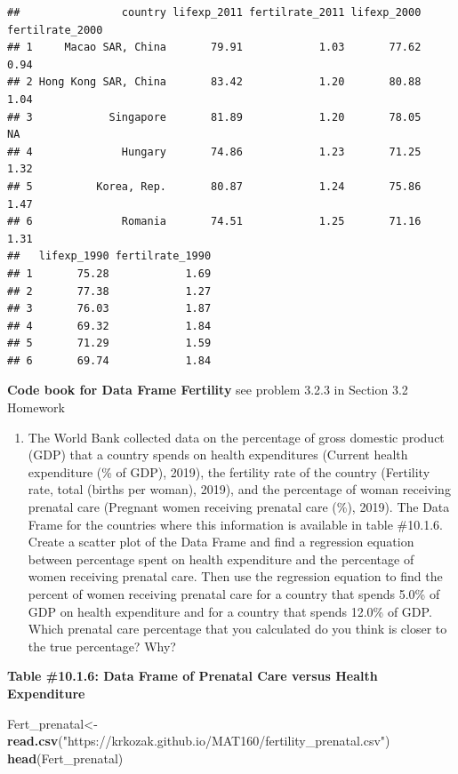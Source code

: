 \documentclass[
]{book}
\newenvironment{Shaded}{\begin{snugshade}}{\end{snugshade}}
\newcommand{\KeywordTok}[1]{\textcolor[rgb]{0.13,0.29,0.53}{\textbf{#1}}}
\newcommand{\NormalTok}[1]{#1}
\newcommand{\StringTok}[1]{\textcolor[rgb]{0.31,0.60,0.02}{#1}}
\providecommand{\tightlist}{%
  \setlength{\itemsep}{0pt}\setlength{\parskip}{0pt}}
\begin{document}
\begin{verbatim}
##                country lifexp_2011 fertilrate_2011 lifexp_2000 fertilrate_2000
## 1     Macao SAR, China       79.91            1.03       77.62            0.94
## 2 Hong Kong SAR, China       83.42            1.20       80.88            1.04
## 3            Singapore       81.89            1.20       78.05              NA
## 4              Hungary       74.86            1.23       71.25            1.32
## 5          Korea, Rep.       80.87            1.24       75.86            1.47
## 6              Romania       74.51            1.25       71.16            1.31
##   lifexp_1990 fertilrate_1990
## 1       75.28            1.69
## 2       77.38            1.27
## 3       76.03            1.87
## 4       69.32            1.84
## 5       71.29            1.59
## 6       69.74            1.84
\end{verbatim}

\textbf{Code book for Data Frame Fertility} see problem 3.2.3 in Section 3.2 Homework

\begin{enumerate}
\def\labelenumi{\arabic{enumi}.}
\setcounter{enumi}{3}
\tightlist
\item
  The World Bank collected data on the percentage of gross domestic product (GDP) that a country spends on health expenditures (Current health expenditure (\% of GDP), 2019), the fertility rate of the country (Fertility rate, total (births per woman), 2019), and the percentage of woman receiving prenatal care (Pregnant women receiving prenatal care (\%), 2019). The Data Frame for the countries where this information is available in table \#10.1.6. Create a scatter plot of the Data Frame and find a regression equation between percentage spent on health expenditure and the percentage of women receiving prenatal care. Then use the regression equation to find the percent of women receiving prenatal care for a country that spends 5.0\% of GDP on health expenditure and for a country that spends 12.0\% of GDP. Which prenatal care percentage that you calculated do you think is closer to the true percentage? Why?
\end{enumerate}

\textbf{Table \#10.1.6: Data Frame of Prenatal Care versus Health Expenditure}

\begin{Shaded}
\begin{Highlighting}[]
\NormalTok{Fert_prenatal<-}\StringTok{ }\KeywordTok{read.csv}\NormalTok{(}\StringTok{"https://krkozak.github.io/MAT160/fertility_prenatal.csv"}\NormalTok{)}
\KeywordTok{head}\NormalTok{(Fert_prenatal)}
\end{Highlighting}
\end{Shaded}
\end{document}

